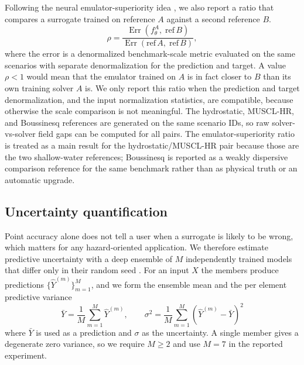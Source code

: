 Following the neural emulator-superiority idea \citep{koehler2026emulator}, we also report a ratio that compares a surrogate trained on reference $A$ against a second reference $B$.
\[
\rho =
\frac{\operatorname{Err}\!\left(f_\theta ^ {A},\; \mathrm{ref}\,B \right)}
     {\operatorname{Err}\!\left(\mathrm{ref}\, A,\; \mathrm{ref}\,B \right)},
\]
where the error is a denormalized benchmark-scale metric evaluated on the same scenarios with separate denormalization for the prediction and target. A value $\rho < 1$ would mean that the emulator trained on $A$ is in fact closer to $B$ than its own training solver $A$ is. We only report this ratio when the prediction and target denormalization, and the input normalization statistics, are compatible, because otherwise the scale comparison is not meaningful. The hydrostatic, MUSCL-HR, and Boussinesq references are generated on the same scenario IDs, so raw solver-vs-solver field gaps can be computed for all pairs. The emulator-superiority ratio is treated as a main result for the hydrostatic/MUSCL-HR pair because those are the two shallow-water references; Boussinesq is reported as a weakly dispersive comparison reference for the same benchmark rather than as physical truth or an automatic upgrade.

\subsection{Uncertainty quantification}
\label{subsec:uncertainty}

Point accuracy alone does not tell a user when a surrogate is likely to be wrong, which matters for any hazard-oriented application. We therefore estimate predictive uncertainty with a deep ensemble of $M$ independently trained models that differ only in their random seed \citep{lakshminarayanan2017deepensembles}. For an input $X$ the members produce predictions $\{\widehat{Y} ^ {(m)}\}_{m = 1} ^ {M}$, and we form the ensemble mean and the per element predictive variance
\[
\bar{Y} = \frac{1}{M}\sum_{m = 1} ^ {M}\widehat{Y} ^ {(m)},
\qquad
\sigma ^ 2 = \frac{1}{M}\sum_{m = 1} ^ {M}\left(\widehat{Y} ^ {(m)} - \bar{Y}\right) ^ 2
\]
where $\bar{Y}$ is used as a prediction and $\sigma$ as the uncertainty. A single member gives a degenerate zero variance, so we require $M \ge 2$ and use $M = 7$ in the reported experiment.

